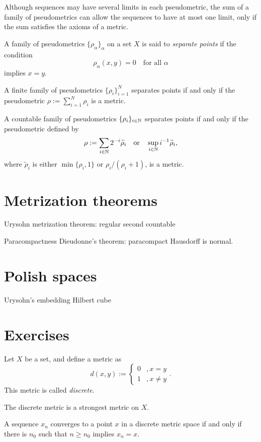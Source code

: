 \documentclass{../../large}
\begin{document}
Although sequences may have several limits in each pseudometric, the sum of a family of pseudometrics can allow the sequences to have at most one limit, only if the sum satisfies the axioms of a metric.

\begin{defn}
A family of pseudometrics $\{\rho_\alpha\}_\alpha$ on a set $X$ is said to \emph{separate points} if the condition 
\[\rho_\alpha(x,y)=0\quad\text{for all $\alpha$}\]
implies $x=y$.
\end{defn}
\begin{prop}
\begin{parts}
\item
A finite family of pseudometrics $\{\rho_i\}_{i=1}^N$ separates points if and only if the pseudometric $\rho:=\sum_{i=1}^N\rho_i$ is a metric.
\item
A countable family of pseudometrics $\{\rho_i\}_{i\in\mathbb{N}}$ separates points if and only if the pseudometric defined by
\[\rho:=\sum_{i\in\mathbb{N}}2^{-i}\widetilde\rho_i\quad\text{or}\quad\sup_{i\in\mathbb{N}}i^{-1}\widetilde\rho_i,\]
where $\tilde\rho_i$ is either $\min\{\rho_i,1\}$ or $\rho_i/(\rho_i+1)$, is a metric.
\end{parts}
\end{prop}





\section{Metrization theorems}

Urysohn metrization theorem: regular second countable

Paracompactness
Dieudonne's theorem: paracompact Hausdorff is normal.


\section{Polish spaces}
\begin{prb}
Urysohn's embedding
Hilbert cube
\end{prb}





\section*{Exercises}

\begin{prb}
Let $X$ be a set, and define a metric as
\[d(x,y):=\begin{cases}0&,x=y\\1&,x\ne y\end{cases}.\]
This metric is called \emph{discrete}.
\begin{parts}
\item
The discrete metric is a strongest metric on $X$.
\item 
\item
A sequence $x_n$ converges to a point $x$ in a discrete metric space if and only if there is $n_0$ such that $n\ge n_0$ implies $x_n=x$.
\end{parts}
\end{prb}
\end{document}
